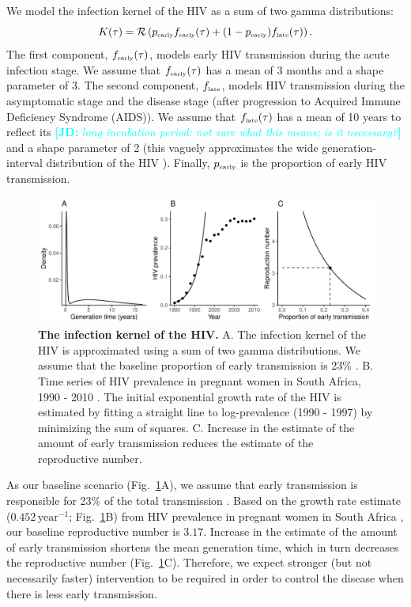 \documentclass[12pt]{article}
\newcommand{\comment}[3]{\textcolor{#1}{\textbf{[#2: }\textit{#3}\textbf{]}}}
\newcommand{\jd}[1]{\comment{cyan}{JD}{#1}}
\newcommand{\tsub}[2]{#1_{{\textrm{\tiny #2}}}}
\newcommand{\figref}[1]{Fig.~\ref{fig:#1}}
\newcommand{\figlab}[1]{\label{fig:#1}}
\begin{document}
We model the infection kernel of the HIV as a sum of two gamma distributions:
\begin{equation}
K(\tau) = \mathcal R \left(\tsub{p}{early} \tsub{f}{early}(\tau) + (1-\tsub{p}{early}) \tsub{f}{late}(\tau) \right).
\end{equation}
The first component, $\tsub{f}{early}(\tau)$, models early HIV transmission during the acute infection stage.
We assume that $\tsub{f}{early}(\tau)$ has a mean of 3 months \citep{hollingsworth2008hiv} and a shape parameter of 3.
The second component, $\tsub{f}{late}$, models HIV transmission during the asymptomatic stage and the disease stage (after progression to Acquired Immune Deficiency Syndrome (AIDS)).
We assume that $\tsub{f}{late}(\tau)$ has a mean of 10 years to reflect its \jd{long incubation period: not sure what this means; is it necessary?} \citep{brookmeyer1989censoring, nishiura2019estimating} and a shape parameter of 2 (this vaguely approximates the wide generation-interval distribution of the HIV \citep{fraser2004factors}).
Finally, $\tsub{p}{early}$ is the proportion of early HIV transmission.

\begin{figure}[!t]
\includegraphics[width=\textwidth]{../figure/HIV.pdf}
\caption{
\textbf{The infection kernel of the HIV.}
A. The infection kernel of the HIV is approximated using a sum of two gamma distributions. We assume that the baseline proportion of early transmission is 23\% \citep{hayes2006amplified}.
B. Time series of HIV prevalence in pregnant women in South Africa, 1990 - 2010 \citep{barron2013eliminating}. The initial exponential growth rate of the HIV is estimated by fitting a straight line to log-prevalence (1990 - 1997) by minimizing the sum of squares.
C. Increase in the estimate of the amount of early transmission reduces the estimate of the reproductive number.
}
\figlab{example}
\end{figure}

As our baseline scenario (\figref{example}A), we assume that early transmission is responsible for 23\% of the total transmission \citep{hayes2006amplified}.
Based on the growth rate estimate ($0.452\,\mathrm{year}^{-1}$; \figref{example}B) from HIV prevalence in pregnant women in South Africa \citep{barron2013eliminating}, our baseline reproductive number is $3.17$.
Increase in the estimate of the amount of early transmission shortens the mean generation time, which in turn decreases the reproductive number (\figref{example}C).
Therefore, we expect stronger (but not necessarily faster) intervention to be required in order to control the disease when there is less early transmission.
\end{document}
